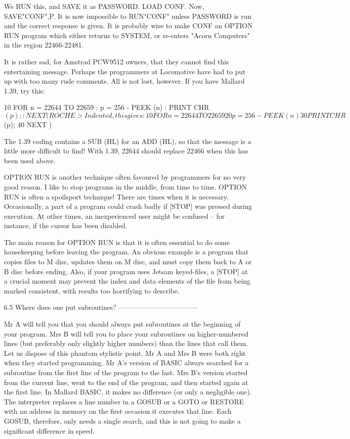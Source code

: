 We RUN this, and SAVE it as PASSWORD. LOAD CONF. Now, SAVE"CONF",P. It is  now 
impossible  to  RUN"CONF" unless PASSWORD is run and the correct  response  is 
given.  It  is probably wise to make CONF an OPTION RUN program  which  either 
returns to SYSTEM, or re-enters "Acorn Computers" in the region 22466-22481.

It  is  rather  sad, for Amstrad PCW9512 owners, that they  cannot  find  this 
entertaining message. Perhaps the programmers at Locomotive have had to put up 
with  too  many rude comments. All is not lost, however. If you  have  Mallard 
1.39, try this:

        10  FOR  n = 22644 TO 22659 : p = 256 - PEEK (n) : PRINT CHR$  (p);  : 
NEXT

(ROCHE> Indented, this gives:

        10 FOR n = 22644 TO 22659
        20     p = 256 - PEEK (n)
        30     PRINT CHR$ (p);
        40 NEXT
)

The 1.39 coding contains a SUB (HL) for an ADD (HL), so that the message is  a 
little more difficult to find! With 1.39, 22644 should replace 22466 when this 
has been used above.

OPTION RUN is another technique often favoured by programmers for no very good 
reason.  I like to stop programs in the middle, from time to time. OPTION  RUN 
is  often  a  spoilsport  technique! There are times  when  it  is  necessary. 
Occasionally,  a  part of a program could crash badly if  [STOP]  was  pressed 
during  execution. At other times, an inexperienced user might be confused  -- 
for instance, if the cursor has been disabled.

The  main  reason  for OPTION RUN is that it is often  essential  to  do  some 
housekeeping before leaving the program. An obvious example is a program  that 
copies  files to M disc, updates them on M disc, and must copy them back to  A 
or  B  disc before ending. Also, if your program uses  Jetsam  keyed-files,  a 
[STOP] at a crucial moment may prevent the index and data elements of the file 
from being marked consistent, with results too horrifying to describe.


6.5 Where does one put subroutines?
-----------------------------------

Mr A will tell you that you should always put subroutines at the beginning  of 
your program. Mrs B will tell you to place your subroutines on higher-numbered 
lines  (but preferably only slightly higher numbers) than the lines that  call 
them. Let us dispose of this phantom stylistic point. Mr A and Mrs B were both 
right  when they started programming. Mr A's version of BASIC always  searched 
for  a  subroutine  from the first line of the program to the  last.  Mrs  B's 
version  started  from the current line, went to the end of the  program,  and 
then started again at the first line. In Mallard BASIC, it makes no difference 
(or only a negligible one). The interpreter replaces a line number in a  GOSUB 
or  a  GOTO  or RESTORE with an address in memory on  the  first  occasion  it 
executes  that  line. Each GOSUB, therefore, only needs a single  search,  and 
this is not going to make a significant difference in speed.

